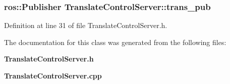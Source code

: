 \subsubsection[{trans\-\_\-pub}]{\setlength{\rightskip}{0pt plus 5cm}ros\-::\-Publisher {\bf \-Translate\-Control\-Server\-::trans\-\_\-pub}\hspace{0.3cm}{\ttfamily  [private]}}\label{classTranslateControlServer_a573578727b5611f4275f7b5debaab90d}


\-Definition at line 31 of file \-Translate\-Control\-Server.\-h.



\-The documentation for this class was generated from the following files\-:\begin{DoxyCompactItemize}
\item 
{\bf \-Translate\-Control\-Server.\-h}\item 
{\bf \-Translate\-Control\-Server.\-cpp}\end{DoxyCompactItemize}
